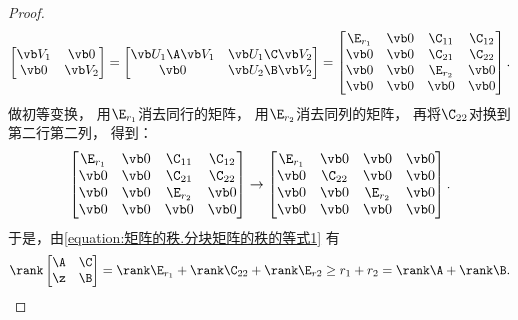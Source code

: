 \begin{example}
\begin{proof}
\[\begin{bmatrix}
		\Q_1 & \vb0 \\
		\vb0 & \Q_2
	\end{bmatrix}
	= \begin{bmatrix}
		\P_1\A\Q_1 & \P_1\C\Q_2 \\
		\vb0 & \P_2\B\Q_2
	\end{bmatrix}
	= \begin{bmatrix}
		\E_{r_1} & \vb0 & \C_{11} & \C_{12} \\
		\vb0 & \vb0 & \C_{21} & \C_{22} \\
		\vb0 & \vb0 & \E_{r_2} & \vb0 \\
		\vb0 & \vb0 & \vb0 & \vb0
	\end{bmatrix}.
\]
做初等变换，
用\(\E_{r_1}\)消去同行的矩阵，
用\(\E_{r_2}\)消去同列的矩阵，
再将\(\C_{22}\)对换到第二行第二列，
得到：\[
	\begin{bmatrix}
		\E_{r_1} & \vb0 & \C_{11} & \C_{12} \\
		\vb0 & \vb0 & \C_{21} & \C_{22} \\
		\vb0 & \vb0 & \E_{r_2} & \vb0 \\
		\vb0 & \vb0 & \vb0 & \vb0
	\end{bmatrix}
	\to \begin{bmatrix}
		\E_{r_1} & \vb0 & \vb0 & \vb0 \\
		\vb0 & \C_{22} & \vb0 & \vb0 \\
		\vb0 & \vb0 & \E_{r_2} & \vb0 \\
		\vb0 & \vb0 & \vb0 & \vb0
	\end{bmatrix}.
\]
于是，由\cref{equation:矩阵的秩.分块矩阵的秩的等式1} 有\[
	\rank\begin{bmatrix}
		\A & \C \\
		\z & \B
	\end{bmatrix}
	= \rank\E_{r_1} + \rank\C_{22} + \rank\E_{r2}
	\geq r_1 + r_2
	= \rank\A + \rank\B.
\]


\end{proof}
\end{example}
